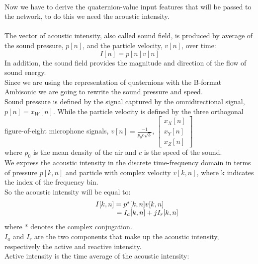 \documentclass{article}
\begin{document}
    \\ Now we have to derive the quaternion-value input features that will be passed to the network, to do this we need the
    acoustic intensity.
    \\ \\ The vector of acoustic intensity, also called sound field, is produced by average of the sound pressure, $p[n]$, and
    the particle velocity, $v[n]$, over time:
    \begin{equation*}
        I[n]=p[n]v[n]
    \end{equation*}
    In addition, the sound field provides the magnitude and direction of the flow of sound energy.
    \\ Since we are using the representation of quaternions with the B-format Ambisonic we are going to rewrite the sound 
    pressure and speed.
    \\ Sound pressure is defined by the signal captured by the omnidirectional signal, $p[n] = x_W[n]$.
    While the particle velocity is defined by the three orthogonal figure-of-eight microphone signals, $v[n]= \frac{-1}{p_0c\sqrt{3}}$,
    $\begin{bmatrix}
            x_X[n] \\
            x_Y[n] \\
            x_Z[n]
        \end{bmatrix}
    $
    \\ where $p_0$ is the mean density of the air and $c$ is the speed of the sound.
    \\ We express the acoustic intensity in the discrete time-frequency domain in terms of pressure $p[k,n]$ and particle with complex
    velocity $v[k, n]$, where k indicates the index of the frequency bin.
    \\ So the acoustic intensity will be equal to:
    \begin{equation*}
        \begin{matrix}
            I[k,n] = p^*[k,n] v[k,n] \\
            \hspace{1.8cm} = I_a[k,n]+jI_r[k,n]
        \end{matrix}
    \end{equation*}
    where * denotes the complex conjugation.
    \\ $I_a$ and $I_r$ are the two components that make up the acoustic intensity, respectively the active and reactive intensity.
    \\ Active intensity is the time average of the acoustic intensity:
\end{document}
